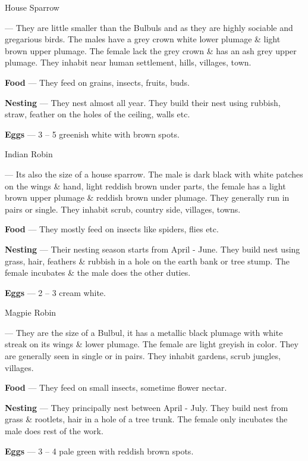 \begin{bird}{House Sparrow}

 --- They are little smaller than the Bulbuls and as they are highly sociable and gregarious birds. The males have a grey crown white lower plumage \& light brown upper plumage. The female lack the grey crown \& has an ash grey upper plumage. They inhabit near human settlement, hills, villages, town. 

{\large\bf Food} --- They feed on grains, insects, fruits, buds.

{\large\bf Nesting} --- They nest almost all year. They build their nest using rubbish, straw, feather on the holes of the ceiling, walls etc.

{\large\bf Eggs} --- 3 -- 5 greenish white with brown spots.
\end{bird}

\begin{bird}{Indian Robin}

 --- Its also the size of a house sparrow. The male is dark black with white patches on the wings \& hand, light reddish brown under parts, the female has a light brown upper plumage \& reddish brown under plumage. They generally run in pairs or single. They inhabit scrub, country side, villages, towns.

{\large\bf Food} --- They mostly feed on insects like spiders, flies etc.

{\large\bf Nesting} --- Their nesting season starts from April - June. They build nest using grass, hair, feathers  \& rubbish in a hole on the earth bank or tree stump. The female incubates \& the male does the other duties.

{\large\bf Eggs} --- 2 -- 3 cream white.
\end{bird}

\begin{bird}{Magpie Robin}

 --- They are the size of a Bulbul, it has a metallic black plumage with white streak on its wings \& lower plumage. The female are light greyish in color. They are generally seen in single or in pairs. They inhabit gardens, scrub jungles, villages.

{\large\bf Food} --- They feed on small insects, sometime flower nectar.

{\large\bf Nesting} --- They principally nest between April - July. They build nest from grass \& rootlets, hair in a hole of a tree trunk. The female only incubates the male does rest of the work.

{\large\bf Eggs} --- 3 -- 4 pale green with reddish brown spots.
\end{bird}

